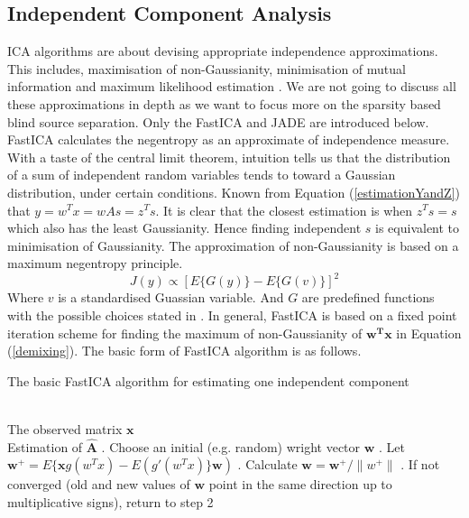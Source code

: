 \subsection{Independent Component Analysis}
ICA algorithms are about devising appropriate independence approximations. This includes, maximisation of non-Gaussianity, minimisation of mutual information and maximum likelihood estimation \cite{HYVARINEN2000411}. We are not going to discuss all these approximations in depth as we want to focus more on the sparsity based blind source separation. Only the FastICA and JADE are introduced below.\\

FastICA calculates the negentropy as an approximate of independence measure. With a taste of the central limit theorem, intuition tells us that the distribution of a sum of independent random variables tends to toward a Gaussian distribution, under certain conditions. Known from Equation (\ref{estimationYandZ}) that $y = w^T x = w A s = z^T s$. It is clear that the closest estimation is when $z^Ts = s$ which also has the least Gaussianity. Hence finding independent $s$ is equivalent to minimisation of Gaussianity. The approximation of non-Gaussianity is based on a maximum negentropy principle.
\begin{equation}
    J(y) \propto [E\{G(y)\} - E\{G(v)\}]^2
\end{equation}
Where $v$ is a standardised Guassian variable. And $G$ are predefined functions with the possible choices stated in \cite{HYVARINEN2000411}. In general, FastICA is based on a fixed point iteration scheme for finding the maximum of non-Gaussianity of $\mathbf{w^T x}$ in Equation (\ref{demixing}). The basic form of FastICA algorithm is as follows.

\begin{algorithm}[!htbp] 
\caption{ The basic FastICA algorithm for estimating one independent component}
\label{alg:Framwork} 
\begin{algorithmic}
\REQUIRE ~~\\%
The observed matrix $\mathbf{x}$
\ENSURE ~~\\ %
Estimation of $\hat{\mathbf{A}}$
. Choose an initial (e.g. random) wright vector $\mathbf{w}$
. Let $\mathbf{w}^+ = E\{\mathbf{x}g(w^T x) - E(g'(w^Tx)\}\mathbf{w})$
. Calculate $\mathbf{w} = \mathbf{w}^{+}/\lVert w^{+}\rVert$
. If not converged (old and new values of $\mathbf{w}$ point in the same direction up to multiplicative signs), return to step 2
\end{algorithmic}
\end{algorithm}


